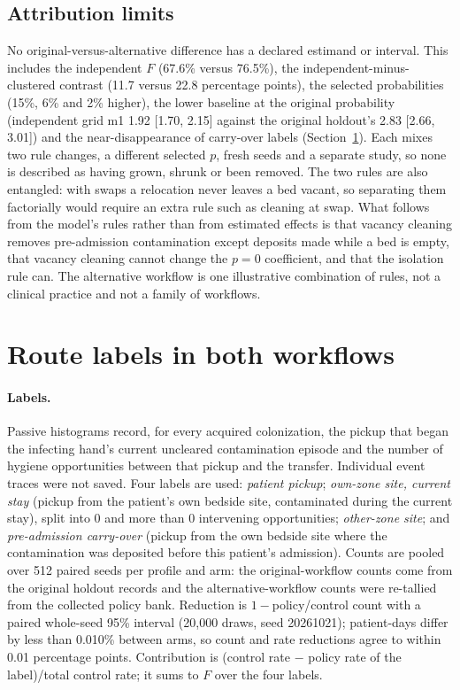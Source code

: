 \documentclass[11pt]{article}
\begin{document}
\subsection{Attribution limits}\label{sec:s-alt-limits}
No original-versus-alternative difference has a declared estimand or interval.
This includes the independent $F$ (67.6\% versus 76.5\%), the
independent-minus-clustered contrast (11.7 versus 22.8 percentage points), the
selected probabilities (15\%, 6\% and 2\% higher), the lower baseline at the
original probability (independent grid m1 1.92 [1.70, 2.15] against the original
holdout's 2.83 [2.66, 3.01]) and the near-disappearance of carry-over labels
(Section~\ref{sec:s-routes}). Each mixes two rule changes, a different selected
$p$, fresh seeds and a separate study, so none is described as having grown,
shrunk or been removed. The two rules are also entangled: with swaps a
relocation never leaves a bed vacant, so separating them factorially would
require an extra rule such as cleaning at swap. What follows from the model's
rules rather than from estimated effects is that vacancy cleaning removes
pre-admission contamination except deposits made while a bed is empty, that
vacancy cleaning cannot change the $p=0$ coefficient, and that the isolation
rule can. The alternative workflow is one illustrative combination of rules,
not a clinical practice and not a family of workflows.

\section{Route labels in both workflows}\label{sec:s-routes}
\paragraph{Labels.} Passive histograms record, for every acquired colonization,
the pickup that began the infecting hand's current uncleared contamination
episode and the number of hygiene opportunities between that pickup and the
transfer. Individual event traces were not saved. Four labels are
used: \emph{patient pickup}; \emph{own-zone site, current stay} (pickup from the
patient's own bedside site, contaminated during the current stay), split into 0
and more than 0 intervening opportunities; \emph{other-zone site}; and
\emph{pre-admission carry-over} (pickup from the own bedside site where the
contamination was deposited before this patient's admission). Counts are pooled
over 512 paired seeds per profile and arm: the original-workflow counts come from
the original holdout records and the alternative-workflow counts were re-tallied
from the collected policy bank. Reduction is $1-$policy/control count with a
paired whole-seed 95\% interval (20,000 draws, seed 20261021); patient-days
differ by less than 0.010\% between arms, so count and rate reductions agree to
within 0.01 percentage points. Contribution is (control rate $-$ policy rate of
the label)/total control rate; it sums to $F$ over the four labels.
\end{document}
